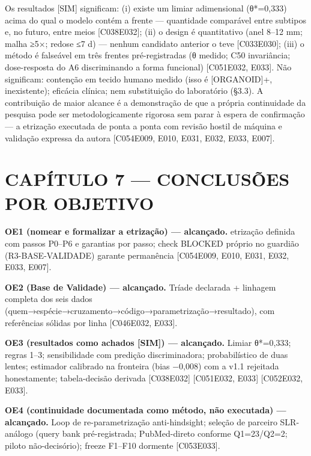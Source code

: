 \documentclass[
  10pt,
]{article}
\begin{document}
Os resultados {[}SIM{]} significam: (i) existe um limiar adimensional
(θ*=0,333) acima do qual o modelo contém a frente --- quantidade
comparável entre subtipos e, no futuro, entre meios
{[}C038\textbar E032{]}; (ii) o design é quantitativo (anel 8--12 mm;
malha ≥5×; redose ≤7 d) --- nenhum candidato anterior o teve
{[}C033\textbar E030{]}; (iii) o método é falseável em três frentes
pré-registradas (θ medido; C50 invariância; dose-resposta do A6
discriminando a forma funcional) {[}C051\textbar E032, E033{]}. Não
significam: contenção em tecido humano medido (isso é {[}ORGANOID{]}+,
inexistente); eficácia clínica; nem substituição do laboratório (§3.3).
A contribuição de maior alcance é a demonstração de que a própria
continuidade da pesquisa pode ser metodologicamente rigorosa sem parar à
espera de confirmação --- a etrização executada de ponta a ponta com
revisão hostil de máquina e validação expressa da autora
{[}C054\textbar E009, E010, E031, E032, E033, E007{]}.

\hypertarget{capuxedtulo-7-conclusuxf5es-por-objetivo}{%
\section{CAPÍTULO 7 --- CONCLUSÕES POR
OBJETIVO}\label{capuxedtulo-7-conclusuxf5es-por-objetivo}}

\textbf{OE1 (nomear e formalizar a etrização) --- alcançado.} etrização
definida com passos P0--P6 e garantias por passo; check BLOCKED próprio
no guardião (R3-BASE-VALIDADE) garante permanência {[}C054\textbar E009,
E010, E031, E032, E033, E007{]}.

\textbf{OE2 (Base de Validade) --- alcançado.} Tríade declarada +
linhagem completa dos seis dados
(quem→espécie→cruzamento→código→parametrização→resultado), com
referências sólidas por linha {[}C046\textbar E032, E033{]}.

\textbf{OE3 (resultados como achados {[}SIM{]}) --- alcançado.} Limiar
θ*=0,333; regras 1--3; sensibilidade com predição discriminadora;
probabilístico de duas lentes; estimador calibrado na fronteira (bias
−0,008) com a v1.1 rejeitada honestamente; tabela-decisão derivada
{[}C038\textbar E032{]} {[}C051\textbar E032, E033{]}
{[}C052\textbar E032, E033{]}.

\textbf{OE4 (continuidade documentada como método, não executada) ---
alcançado.} Loop de re-parametrização anti-hindsight; seleção de
parceiro SLR-análogo (query bank pré-registrada; PubMed-direto conforme
Q1=23/Q2=2; piloto não-decisório); freeze F1--F10 dormente
{[}C053\textbar E033{]}.
\end{document}
